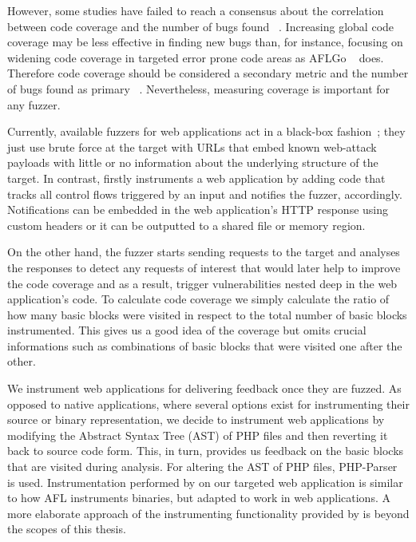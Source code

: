 However, some studies have failed to reach a consensus about the correlation between code coverage and the number of bugs found ~\cite{klees2018Evaluation,coverage2014effectiveness}. 
Increasing global code coverage may be less effective in finding new bugs than, for instance, focusing on widening code coverage in targeted error prone code areas as AFLGo ~\cite{bohme2017directed} does. Therefore code coverage should be considered a secondary metric and the number of bugs found as primary ~\cite{klees2018Evaluation}. Nevertheless, measuring coverage is important for any fuzzer.

Currently, available fuzzers for web applications act in a black-box fashion~\cite{doupe2010johnny}; they just use brute force at the target with URLs that embed known web-attack payloads with little or no information about the underlying structure of the target. 
In contrast, \pname firstly instruments a web application by adding code that tracks all control flows triggered by an input and notifies the fuzzer, accordingly. Notifications can be embedded in the web application's HTTP response using custom headers or it can be outputted to a shared file or memory region. 

On the other hand, the fuzzer starts sending requests to the target and analyses the responses to detect any requests of interest that would later help to improve the code coverage and as a result, trigger vulnerabilities nested deep in the web application's code. To calculate code coverage we simply calculate the ratio of how many basic blocks were visited in respect to the total number of basic blocks instrumented. This gives us a good idea of the coverage but omits crucial informations such as combinations of basic blocks that were visited one after the other.

We instrument web applications for delivering feedback once
they are fuzzed. As opposed to native applications, where
several options exist for instrumenting their source or binary
representation, we decide to instrument web applications by
modifying the Abstract Syntax Tree (AST) of PHP files and then reverting it back to source code form. This, in turn, provides us feedback on the basic blocks that are visited during analysis. For altering the AST of PHP files, PHP-Parser ~\cite{nikicPhpParser} is used. 
Instrumentation performed by \pname on our targeted web application is similar to how AFL instruments binaries, but adapted to work in web applications. A more elaborate approach of the instrumenting functionality provided by \pname is beyond the scopes of this thesis.

